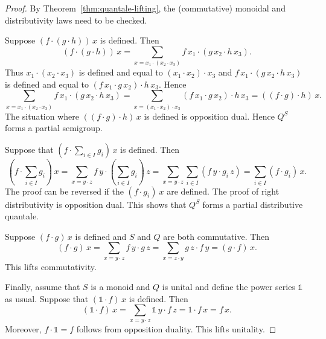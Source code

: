 \documentclass[12pt]{article}
\theoremstyle{definition}
\newcommand{\unit}{\mathbb{1}}
\begin{document}
\begin{proof}
  By Theorem~\ref{thm:quantale-lifting}, the (commutative) monoidal
  and distributivity laws need to be checked.

  Suppose $(f\cdot (g \cdot h))\, x$ is defined. Then
\begin{equation*}
  (f\cdot (g \cdot h))\, x = \sum_{x=x_1\cdot (x_2\cdot x_3)} f\, x_1 \cdot (g\, x_2 \cdot h\, x_3).
\end{equation*}
Thus $x_1\cdot (x_2\cdot x_3)$ is defined and equal to $(x_1\cdot
x_2)\cdot x_3$ and $f\, x_1 \cdot (g\, x_2 \cdot h\, x_3)$ is defined and
equal to $(f\, x_1 \cdot g\, x_2) \cdot h\, x_3$. Hence
\begin{equation*}
  \sum_{x=x_1\cdot (x_2\cdot x_3)} f\, x_1 \cdot (g\, x_2 \cdot h\, x_3)=
\sum_{x=(x_1\cdot x_2)\cdot x_3} (f\, x_1 \cdot g\, x_2) \cdot h\, x_3
 = ((f\cdot g)\cdot h)\, x.
\end{equation*}
The situation where $((f\cdot g)\cdot h)\, x$ is defined is
opposition dual. Hence $Q^S$ forms a partial semigroup. 

Suppose that $ (f\cdot \sum_{i\in I} g_i)\, x$ is defined. Then
\begin{equation*}
  (f\cdot \sum_{i\in I} g_i)\, x = \sum_{x=y\cdot z} f\, y \cdot
  (\sum_{i\in I} g_i)\, z
  = \sum_{x=y\cdot z} \sum_{i\in I} (f\, y \cdot g_i\, z)
  = \sum_{i\in I} (f\cdot g_i)\, x.
\end{equation*}
The proof can be reversed if the $(f\cdot g_i)\ x$  are
defined. The proof of right distributivity is opposition dual.  This
shows that $Q^S$ forms a partial distributive quantale.

Suppose $(f \cdot g)\, x$ is defined and $S$ and $Q$ are both
commutative. Then
\begin{equation*}
  (f\cdot g)\, x = \sum_{x=y\cdot z}f\, y \cdot g\, z = \sum_{x=z\cdot y}g\, z \cdot f\, y = (g\cdot f)\, x.
\end{equation*}
This lifts commutativity.

Finally, assume that $S$ is a monoid and $Q$ is unital and define the
power series $\unit$ as usual. Suppose that $(\unit \cdot f)\, x$ is
defined. Then
\begin{equation*}
  (\unit\cdot f)\, x = \sum_{x=y\cdot z} \unit\, y \cdot f\, z = 1\cdot f\, x = f\, x.
\end{equation*}
Moreover, $f\cdot \unit =f$ follows from opposition duality. This lifts
unitality.
\end{proof}
\end{document}

